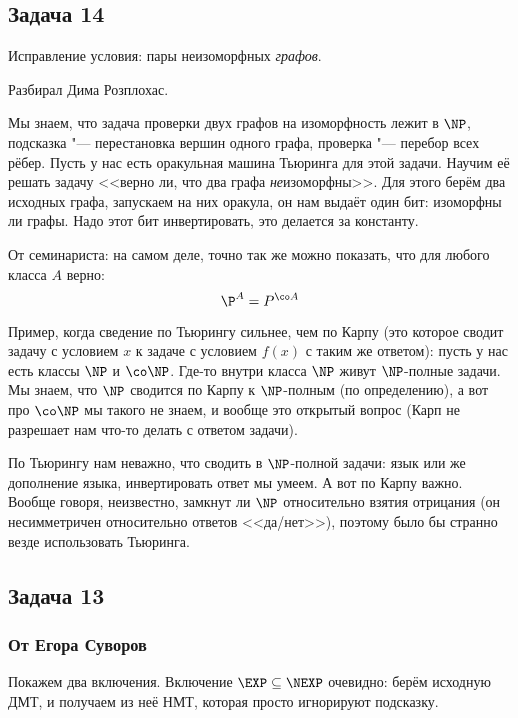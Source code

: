 \subsection{Задача 14}
	Исправление условия: пары неизоморфных \textit{графов}.

	Разбирал Дима Розплохас.

	Мы знаем, что задача проверки двух графов на изоморфность лежит в $\NP$,
	подсказка "--- перестановка вершин одного графа, проверка "--- перебор всех рёбер.
	Пусть у нас есть оракульная машина Тьюринга для этой задачи.
	Научим её решать задачу <<верно ли, что два графа \textit{не}изоморфны>>.
	Для этого берём два исходных графа, запускаем на них оракула, он нам выдаёт
	один бит: изоморфны ли графы.
	Надо этот бит инвертировать, это делается за константу.

	\begin{Rem}
		От семинариста: на самом деле, точно так же можно показать, что для любого
		класса $A$ верно:
		\[ \P^A = P^{\co A} \]
	\end{Rem}
	\begin{Rem}\label{task_14_rem_turing}
		Пример, когда сведение по Тьюрингу сильнее, чем по Карпу (это которое сводит задачу
		с условием $x$ к задаче с условием $f(x)$ с таким же ответом):
		пусть у нас есть классы $\NP$ и $\co\NP$.
		Где-то внутри класса $\NP$ живут $\NP$-полные задачи.
		Мы знаем, что $\NP$ сводится по Карпу к $\NP$-полным (по определению),
		а вот про $\co\NP$ мы такого не знаем, и вообще это открытый вопрос (Карп не разрешает нам что-то делать
		с ответом задачи).

		По Тьюрингу нам неважно, что сводить в $\NP$-полной задачи: язык или же дополнение языка,
		инвертировать ответ мы умеем.
		А вот по Карпу важно.
		Вообще говоря, неизвестно, замкнут ли $\NP$ относительно взятия отрицания (он несимметричен относительно
		ответов <<да/нет>>), поэтому было бы странно везде использовать Тьюринга.
	\end{Rem}

\subsection{Задача 13}
	\subsubsection{От Егора Суворов}
		Покажем два включения.
		Включение $\EXP \subseteq \NEXP$ очевидно: берём исходную ДМТ, и получаем
		из неё НМТ, которая просто игнорируют подсказку.

